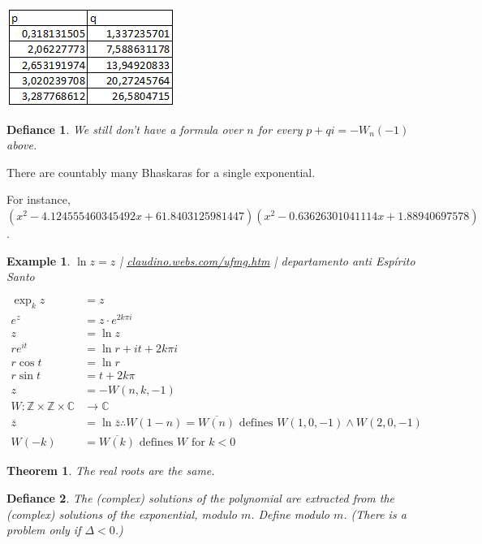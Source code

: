 \documentclass[12pt,a4paper]{article}
\newtheorem{defy}{Defiance}
\newtheorem{thm}{Theorem}[section]
\newtheorem{example}{Example}[section]
\begin{document}
		\begin{center}
		\includegraphics{tabelaPontoFixo}
		\end{center}

\begin{defy}
We still don't have a formula over $n$ for every $p + qi = - W_n(-1)$ above.
\end{defy}

There are countably many Bhaskaras for a single exponential.

For instance, $(x^2 - 4.124555460345492 x + 61.8403125981447) (x^2 - 0.63626301041114 x + 1.88940697578)$.

\begin{example} $\ln z = z$ | \href{https://github.com/boralaemcasa/propagation/blob/master/webs%20dot%20com/ufmg.htm}{\color{blue}\underline{claudino.webs.com/ufmg.htm}} | departamento anti Esp\'irito Santo
\end{example}

\begin{align}
\exp_k z &= z \\
e^z &= z \cdot e^{2k\pi i} \\
z &= \ln z \\
re^{it} &= \ln r + it + 2k\pi i \\
r \cos t &= \ln r \\
r \sin t &= t + 2k\pi \\
z &= - W(n, k, -1) \\
W : \mathbb{Z} \times \mathbb{Z} \times \mathbb{C} &\rightarrow \mathbb{C} \\
\overline{z} &= \ln \overline{z} \therefore W(1-n) = \overline{W(n)} \text{ defines } W(1,0,-1) \wedge W(2,0,-1) \\
W(-k) &= \overline{W(k)} \text{ defines }W\text{ for }k < 0
\end{align}

\begin{thm}
The real roots are the same.
\end{thm}

\begin{defy}
The (complex) solutions of the polynomial are extracted from the (complex) solutions of the exponential, modulo $m$. Define modulo $m$. (There is a problem only if $\Delta < 0$.)
\end{defy}
\end{document}

